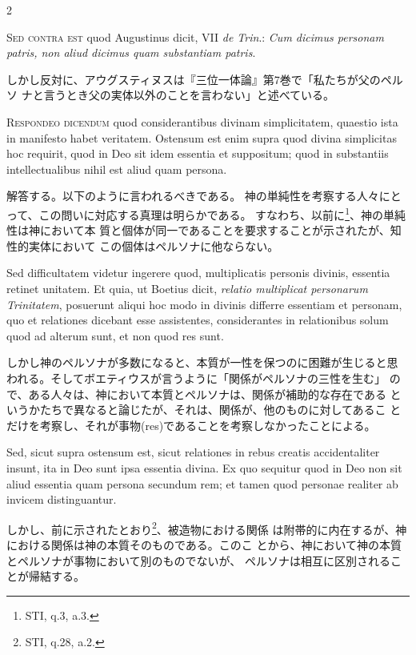 \documentclass[paper=a4paper,fontsize=10pt,jafontsize=9pt,titlepage]{jlreq}
\begin{document}
\begin{paracol}{2}
\switchcolumn*

{\scshape Sed contra est} quod Augustinus dicit, VII {\itshape de
 Trin}.: {\itshape Cum dicimus personam
patris, non aliud dicimus quam substantiam patris}.

\switchcolumn

しかし反対に、アウグスティヌスは『三位一体論』第7巻で「私たちが父のペルソ
 ナと言うとき父の実体以外のことを言わない」と述べている。

\switchcolumn*

{\scshape Respondeo dicendum} quod considerantibus divinam simplicitatem, quaestio
ista in manifesto habet veritatem. Ostensum est enim supra quod divina
simplicitas hoc requirit, quod in Deo sit idem essentia et suppositum;
quod in substantiis intellectualibus nihil est aliud quam persona.

\switchcolumn

解答する。以下のように言われるべきである。
神の単純性を考察する人々にとって、この問いに対応する真理は明らかである。
 すなわち、以前に\footnote{STI, q.3, a.3.}、神の単純性は神において本
 質と個体が同一であることを要求することが示されたが、知性的実体において
 この個体はペルソナに他ならない。

\switchcolumn*

Sed
difficultatem videtur ingerere quod, multiplicatis personis divinis,
essentia retinet unitatem. 
Et quia, ut Boetius dicit, {\itshape relatio
multiplicat personarum Trinitatem}, posuerunt aliqui hoc modo in divinis
differre essentiam et personam, quo et relationes dicebant esse
assistentes, considerantes in relationibus solum quod ad alterum sunt,
et non quod res sunt.

\switchcolumn

しかし神のペルソナが多数になると、本質が一性を保つのに困難が生じると思
 われる。そしてボエティウスが言うように「関係がペルソナの三性を生む」
 ので、ある人々は、神において本質とペルソナは、関係が補助的な存在である
 というかたちで異なると論じたが、それは、関係が、他のものに対してあるこ
 とだけを考察し、それが事物(res)であることを考察しなかったことによる。

\switchcolumn*

Sed, sicut supra ostensum est, sicut relationes in
rebus creatis accidentaliter insunt, ita in Deo sunt ipsa essentia
divina. 
Ex quo sequitur quod in Deo non sit aliud essentia quam persona
secundum rem; et tamen quod personae realiter ab invicem
distinguantur.

\switchcolumn

しかし、前に示されたとおり\footnote{STI, q.28, a.2.}、被造物における関係
 は附帯的に内在するが、神における関係は神の本質そのものである。このこ
 とから、神において神の本質とペルソナが事物において別のものでないが、
 ペルソナは相互に区別されることが帰結する。


\end{paracol}
\end{document}
